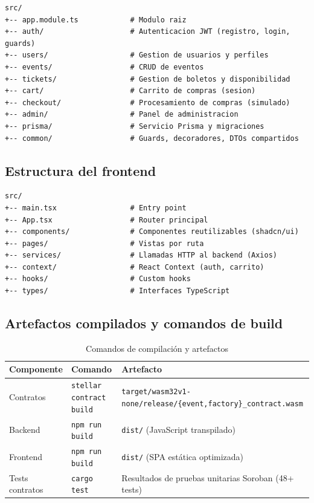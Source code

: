 \documentclass[12pt,oneside]{article}
\begin{document}
\begin{verbatim}
src/
+-- app.module.ts            # Modulo raiz
+-- auth/                    # Autenticacion JWT (registro, login, guards)
+-- users/                   # Gestion de usuarios y perfiles
+-- events/                  # CRUD de eventos
+-- tickets/                 # Gestion de boletos y disponibilidad
+-- cart/                    # Carrito de compras (sesion)
+-- checkout/                # Procesamiento de compras (simulado)
+-- admin/                   # Panel de administracion
+-- prisma/                  # Servicio Prisma y migraciones
+-- common/                  # Guards, decoradores, DTOs compartidos
\end{verbatim}

\subsection{Estructura del frontend}

\begin{verbatim}
src/
+-- main.tsx                 # Entry point
+-- App.tsx                  # Router principal
+-- components/              # Componentes reutilizables (shadcn/ui)
+-- pages/                   # Vistas por ruta
+-- services/                # Llamadas HTTP al backend (Axios)
+-- context/                 # React Context (auth, carrito)
+-- hooks/                   # Custom hooks
+-- types/                   # Interfaces TypeScript
\end{verbatim}

\subsection{Artefactos compilados y comandos de build}

\begin{table}[htbp]
\centering
\caption{Comandos de compilación y artefactos}
\small
\begin{tabularx}{\textwidth}{l l X}
\toprule
\textbf{Componente} & \textbf{Comando} & \textbf{Artefacto} \\
\midrule
Contratos & \texttt{stellar contract build} & \texttt{target/wasm32v1-none/release/\{event,factory\}\_contract.wasm} \\
Backend & \texttt{npm run build} & \texttt{dist/} (JavaScript transpilado) \\
Frontend & \texttt{npm run build} & \texttt{dist/} (SPA estática optimizada) \\
Tests contratos & \texttt{cargo test} & Resultados de pruebas unitarias Soroban (48+ tests) \\
\bottomrule
\end{tabularx}
\end{table}
\end{document}
